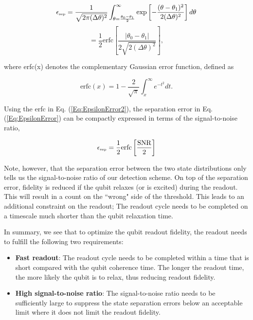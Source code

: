 \documentclass[aip,apr,twocolumn,showpacs,superscriptaddress,groupedaddress,nofootinbib,reprint]{revtex4-1}  %
\begin{document}
\begin{equation*}
\epsilon_{\mbox{\tiny{sep}}} = \frac{1}{\sqrt{2\pi(\Delta\theta)^2}} \int_{\theta = \frac{\theta_0 - \theta_1}{2}}^{\infty}\exp\left[{-\frac{(\theta - \theta_1)^2}{2(\Delta\theta)^2}}\right]d\theta
\end{equation*}
\begin{equation}
 = \frac{1}{2}\mbox{erfc}\left[ \frac{\left| \theta_0 - \theta_1\right|}{2\sqrt{2(\Delta\theta)^2}}\right],
\label{Eq:EpsilonError}
\end{equation}

\noindent where erfc(x) denotes the complementary Gaussian error function, defined as

\begin{equation}
\mbox{erfc}(x) = 1 - \frac{2}{\sqrt{\pi}}\int_{x}^{\infty}e^{-t^2}dt.
\label{Eq:EpsilonError2}
\end{equation}

Using the erfc in Eq. (\ref{Eq:EpsilonError2}), the separation error in Eq. (\ref{Eq:EpsilonError}) can be compactly expressed in terms of the signal-to-noise ratio,

\begin{equation}
\epsilon_{\mbox{\tiny{sep}}} = \frac{1}{2}\mbox{erfc}\left[\frac{\mbox{SNR}}{2}\right]
\label{Eq:EpsilonError3}
\end{equation}

Note, however, that the separation error between the two state distributions only tells us the signal-to-noise ratio of our detection scheme. On top of the separation error, fidelity is reduced if the qubit relaxes (or is excited) during the readout. This will result in a count on the ``wrong" side of the threshold. This leads to an additional constraint on the readout; The readout cycle needs to be completed on a timescale much shorter than the qubit relaxation time.

In summary, we see that to optimize the qubit readout fidelity, the readout needs to fulfill the following two requirements:

\begin{itemize}

	\item{\textbf{Fast readout}: The readout cycle needs to be completed within a time that is short compared with the qubit coherence time. The longer the readout time, the more likely the qubit is to relax, thus reducing readout fidelity.}

	\item{\textbf{High signal-to-noise ratio}: The signal-to-noise ratio needs to be sufficiently large to suppress the state separation errors below an acceptable limit where it does not limit the readout fidelity.}

\end{itemize}
\end{document}
